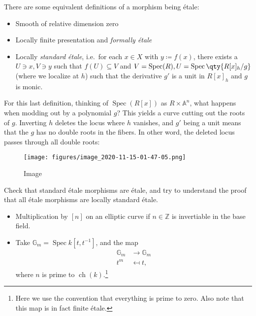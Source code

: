 \begin{remark}

There are some equivalent definitions of a morphism being étale:

\begin{itemize}
\item
  Smooth of relative dimension zero
\item
  Locally finite presentation and \emph{formally étale}
\item
  Locally \emph{standard étale}, i.e.~for each \(x\in X\) with
  \(y\coloneqq f(x)\), there exists a \(U\ni x, V\ni y\) such that
  \(f(U) \subseteq V\) and
  \(V=\operatorname{Spec}(R), U = \operatorname{Spec}\qty{R[x]_h / g}\)
  (where we localize at \(h\)) such that the derivative \(g'\) is a unit
  in \(R[x]_h\) and \(g\) is monic.
\end{itemize}

For this last definition, thinking of \(\operatorname{Spec}(R[x])\) as
\(R\times {\mathbb{A}}^n\), what happens when modding out by a
polynomial \(g\)? This yields a curve cutting out the roots of \(g\).
Inverting \(h\) deletes the locus where \(h\) vanishes, and \(g'\) being
a unit means that the \(g\) has no double roots in the fibers. In other
word, the deleted locus passes through all double roots:

\begin{figure}
\centering
\texttt{[image: figures/image\_2020-11-15-01-47-05.png]}
\caption{Image}
\end{figure}

\end{remark}

\begin{exercise}[?]

Check that standard étale morphisms are étale, and try to understand the
proof that all étale morphisms are locally standard étale.

\end{exercise}

\begin{example}

\envlist

\begin{itemize}
\item
  Multiplication by \([n]\) on an elliptic curve if
  \(n \in {\mathbb{Z}}\) is invertiable in the base field.
\item
  Take \({\mathbb{G}}_m = \operatorname{Spec}k[t, t^{-1}]\), and the map
  \begin{align*}  
  {\mathbb{G}}_m &\to {\mathbb{G}}_m \\
   t^m &\mapsfrom t
  ,\end{align*}
  where \(n\) is prime to \(\operatorname{ch}(k)\).\footnote{Here we use
    the convention that everything is prime to zero. Also note that this
    map is in fact finite étale.}
\end{itemize}

\end{example}

